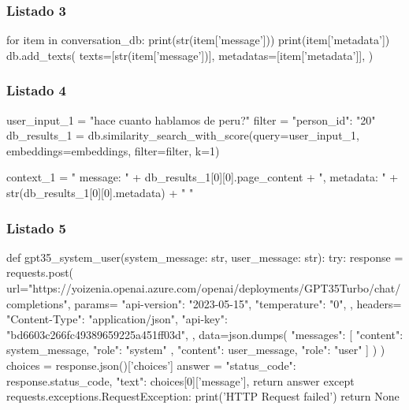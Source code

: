 \subsubsection{Listado 3}
\label{anexo:code-4-1-5-3}

\begin{APACode}
for item in conversation_db:
    print(str(item['message']))
    print(item['metadata'])
    db.add_texts(
        texts=[str(item['message'])],
        metadatas=[item['metadata']],
    )
\end{APACode}

\subsubsection{Listado 4}
\label{anexo:code-4-1-5-4}

\begin{APACode}
user_input_1 = "hace cuanto hablamos de peru?"
filter = {"person_id": "20"}
db_results_1 = db.similarity_search_with_score(query=user_input_1, 
                                               embeddings=embeddings, 
                                               filter=filter, k=1)

context_1 = "{ message: " + db_results_1[0][0].page_content + 
            ", metadata: " + str(db_results_1[0][0].metadata) + " }"
\end{APACode}

\subsubsection{Listado 5}
\label{anexo:code-4-1-5-5}

\begin{APACode}
def gpt35_system_user(system_message: str, user_message: str):
    try:
        response = requests.post(
            url="https://yoizenia.openai.azure.com/openai/deployments/GPT35Turbo/chat/completions",
            params={
                "api-version": "2023-05-15",
                "temperature": "0",
            },
            headers={
                "Content-Type": "application/json",
                "api-key": "bd6603c266fc49389659225a451ff03d",
            },
            data=json.dumps({
                "messages": [
                    {
                        "content": system_message,
                        "role": "system"
                    },
                    {
                        "content": user_message,
                        "role": "user"
                    }
                ]
            })
        )
        choices = response.json()['choices']
        answer = {
            "status_code": response.status_code,
            "text": choices[0]['message'],
        }
        return answer
    except requests.exceptions.RequestException:
        print('HTTP Request failed')
        return None
\end{APACode}

